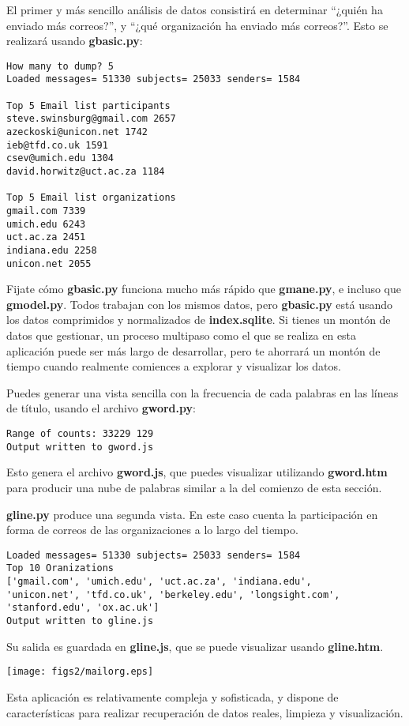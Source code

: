 El primer y más sencillo análisis de datos consistirá en determinar ``¿quién ha enviado más correos?'',
y ``¿qué organización ha enviado más correos?''. Esto se realizará usando {\bf gbasic.py}:

\beforeverb
\begin{verbatim}
How many to dump? 5
Loaded messages= 51330 subjects= 25033 senders= 1584

Top 5 Email list participants
steve.swinsburg@gmail.com 2657
azeckoski@unicon.net 1742
ieb@tfd.co.uk 1591
csev@umich.edu 1304
david.horwitz@uct.ac.za 1184

Top 5 Email list organizations
gmail.com 7339
umich.edu 6243
uct.ac.za 2451
indiana.edu 2258
unicon.net 2055
\end{verbatim}
\afterverb
%
Fijate cómo {\bf gbasic.py} funciona mucho más rápido que {\bf gmane.py},
e incluso que {\bf gmodel.py}. Todos trabajan con los mismos datos, pero
{\bf gbasic.py} está usando los datos comprimidos y normalizados de
{\bf index.sqlite}. Si tienes un montón de datos que gestionar, un proceso
multipaso como el que se realiza en esta aplicación puede ser más largo de desarrollar,
pero te ahorrará un montón de tiempo cuando realmente comiences a explorar
y visualizar los datos.

Puedes generar una vista sencilla con la frecuencia de cada palabras en las
líneas de título, usando el archivo {\bf gword.py}:

\beforeverb
\begin{verbatim}
Range of counts: 33229 129
Output written to gword.js
\end{verbatim}
\afterverb
%
Esto genera el archivo {\bf gword.js}, que puedes visualizar utilizando
{\bf gword.htm} para producir una nube de palabras similar a la del comienzo
de esta sección. 

{\bf gline.py} produce una segunda vista. En este caso cuenta la participación
en forma de correos de las organizaciones a lo largo del tiempo.

\beforeverb
\begin{verbatim}
Loaded messages= 51330 subjects= 25033 senders= 1584
Top 10 Oranizations
['gmail.com', 'umich.edu', 'uct.ac.za', 'indiana.edu', 
'unicon.net', 'tfd.co.uk', 'berkeley.edu', 'longsight.com', 
'stanford.edu', 'ox.ac.uk']
Output written to gline.js
\end{verbatim}
\afterverb
%
Su salida es guardada en {\bf gline.js}, que se puede visualizar usando {\bf gline.htm}.

\beforefig
\centerline{\texttt{[image: figs2/mailorg.eps]}}
\afterfig

Esta aplicación es relativamente compleja y sofisticada, y
dispone de características para realizar recuperación de datos reales, limpieza y visualización.
